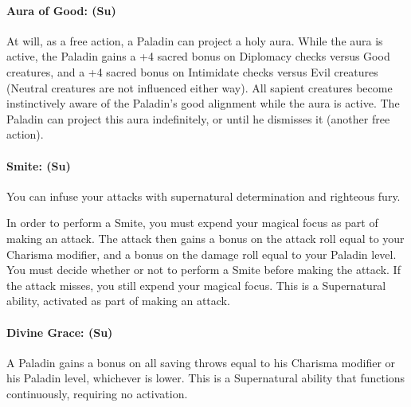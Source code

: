 \paragraph{Aura of Good: (Su)} 
At will, as a free action, a Paladin can project a holy aura.
While the aura is active, the Paladin gains a +4 sacred bonus on Diplomacy checks versus Good creatures, and a +4 sacred bonus on Intimidate checks versus Evil creatures (Neutral creatures are not influenced either way).
All sapient creatures become instinctively aware of the Paladin's good alignment while the aura is active.
The Paladin can project this aura indefinitely, or until he dismisses it (another free action). 

\paragraph[Smite]{Smite: (Su)}
\label{sec:Smite}
You can infuse your attacks with supernatural determination and righteous fury.

In order to perform a Smite, you must expend your magical focus as part of making an attack.
The attack then gains a bonus on the attack roll equal to your Charisma modifier, and a bonus on the damage roll equal to your Paladin level.
You must decide whether or not to perform a Smite before making the attack. 
If the attack misses, you still expend your magical focus.
This is a Supernatural ability, activated as part of making an attack.

\paragraph{Divine Grace: (Su)} A Paladin gains a bonus on all saving throws equal to his Charisma modifier or his Paladin level, whichever is lower.
This is a Supernatural ability that functions continuously, requiring no activation.

